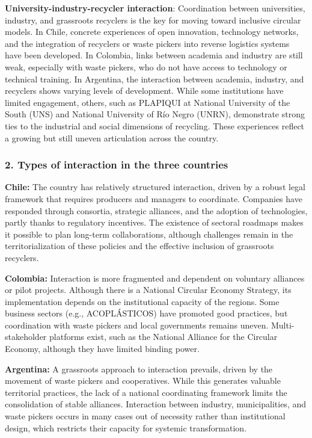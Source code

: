 \documentclass[
  12pt,
  oneside]{book}
\begin{document}
\textbf{University-industry-recycler interaction}: Coordination between
universities, industry, and grassroots recyclers is the key for moving
toward inclusive circular models. In Chile, concrete experiences of open
innovation, technology networks, and the integration of recyclers or
waste pickers into reverse logistics systems have been developed. In
Colombia, links between academia and industry are still weak, especially
with waste pickers, who do not have access to technology or technical
training. In Argentina, the interaction between academia, industry, and
recyclers shows varying levels of development. While some institutions
have limited engagement, others, such as PLAPIQUI at National University
of the South (UNS) and National University of Río Negro (UNRN),
demonstrate strong ties to the industrial and social dimensions of
recycling. These experiences reflect a growing but still uneven
articulation across the country.

\subsubsection{2. Types of interaction in the three
countries}\label{types-of-interaction-in-the-three-countries}

\textbf{Chile:} The country has relatively structured interaction,
driven by a robust legal framework that requires producers and managers
to coordinate. Companies have responded through consortia, strategic
alliances, and the adoption of technologies, partly thanks to regulatory
incentives. The existence of sectoral roadmaps makes it possible to plan
long-term collaborations, although challenges remain in the
territorialization of these policies and the effective inclusion of
grassroots recyclers.

\textbf{Colombia:} Interaction is more fragmented and dependent on
voluntary alliances or pilot projects. Although there is a National
Circular Economy Strategy, its implementation depends on the
institutional capacity of the regions. Some business sectors (e.g.,
ACOPLÁSTICOS) have promoted good practices, but coordination with waste
pickers and local governments remains uneven. Multi-stakeholder
platforms exist, such as the National Alliance for the Circular Economy,
although they have limited binding power.

\textbf{Argentina:} A grassroots approach to interaction prevails,
driven by the movement of waste pickers and cooperatives. While this
generates valuable territorial practices, the lack of a national
coordinating framework limits the consolidation of stable alliances.
Interaction between industry, municipalities, and waste pickers occurs
in many cases out of necessity rather than institutional design, which
restricts their capacity for systemic transformation.
\end{document}
